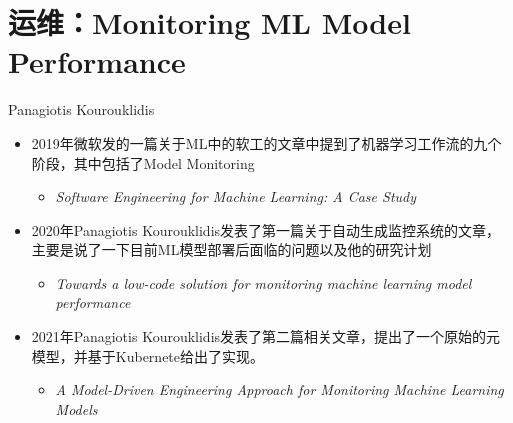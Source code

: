 \documentclass{beamer}
\begin{document}
\section{运维：Monitoring ML Model Performance}
\begin{frame}{Panagiotis Kourouklidis}
    \begin{itemize}
        \item 2019年微软发的一篇关于ML中的软工的文章中提到了机器学习工作流的九个阶段，其中包括了Model Monitoring
        \begin{itemize}
            \item \textit{Software Engineering for Machine Learning: A Case Study}
        \end{itemize}
        \item 2020年Panagiotis Kourouklidis发表了第一篇关于自动生成监控系统的文章，主要是说了一下目前ML模型部署后面临的问题以及他的研究计划
        \begin{itemize}
            \item \textit{Towards a low-code solution for monitoring machine learning model performance}
        \end{itemize}
        \item 2021年Panagiotis Kourouklidis发表了第二篇相关文章，提出了一个原始的元模型，并基于Kubernete给出了实现。
        \begin{itemize}
            \item \textit{A Model-Driven Engineering Approach for Monitoring Machine Learning Models}
        \end{itemize}
    \end{itemize}
\end{frame}
\end{document}
